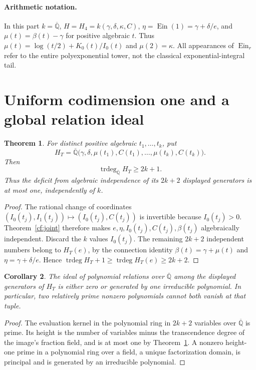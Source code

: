 \documentclass[11pt]{article}
\newtheorem{theorem}{Theorem}[section]
\newtheorem{corollary}[theorem]{Corollary}
\theoremstyle{definition}
\theoremstyle{remark}
\newcommand{\Qa}{\overline{\mathbb Q}}
\newcommand{\trdeg}{\operatorname{trdeg}}
\newcommand{\Ein}{\operatorname{Ein}}
\begin{document}
\paragraph{Arithmetic notation.}
In this part $k=\overline{\mathbb Q}$, $H=H_4=k(\gamma,\delta,\kappa,C)$,
$\eta=\Ein(1)=\gamma+\delta/e$, and
$\mu(t)=\beta(t)-\gamma$ for positive algebraic $t$.
Thus $\mu(t)=\log(t/2)+K_0(t)/I_0(t)$ and $\mu(2)=\kappa$.
All appearances of $\Ein_r$ refer to the entire
polyexponential tower, not the classical exponential-integral tail.

\section{Uniform codimension one and a global relation ideal}
\begin{theorem}\label{thm:many}
For distinct positive algebraic $t_1,\ldots,t_k$, put
\[
H_T=\Qa\bigl(\gamma,\delta,\mu(t_1),C(t_1),\ldots,
                       \mu(t_k),C(t_k)\bigr).
\]
Then
\begin{equation}\label{eq:many}
\trdeg_{\Qa}H_T\ge2k+1.
\end{equation}
Thus the deficit from algebraic independence of its $2k+2$ displayed
generators is at most one, independently of $k$.
\end{theorem}
\begin{proof}
The rational change of coordinates
$(I_0(t_j),I_1(t_j))\mapsto(I_0(t_j),C(t_j))$ is invertible because
$I_0(t_j)>0$. Theorem~\ref{cf:joint} therefore makes
$e,\eta,I_0(t_j),C(t_j),\beta(t_j)$ algebraically independent.
Discard the $k$ values $I_0(t_j)$. The remaining $2k+2$ independent
numbers belong to $H_T(e)$, by the connection identity $\beta(t)=\gamma+\mu(t)$ and
$\eta=\gamma+\delta/e$. Hence
$\trdeg H_T+1\ge\trdeg H_T(e)\ge2k+2$.
\end{proof}

\begin{corollary}\label{cor:finiteideal}
The ideal of polynomial relations over $\Qa$ among the displayed
generators of $H_T$ is either zero or generated by one irreducible
polynomial. In particular, two relatively prime nonzero polynomials
cannot both vanish at that tuple.
\end{corollary}
\begin{proof}
The evaluation kernel in the polynomial ring in $2k+2$ variables over
$\Qa$ is prime. Its height is the number of variables minus the
transcendence degree of the image's fraction field, and is at most one
by Theorem~\ref{thm:many}. A nonzero height-one prime in a polynomial
ring over a field, a unique factorization domain, is principal and is
generated by an irreducible polynomial.
\end{proof}
\end{document}
